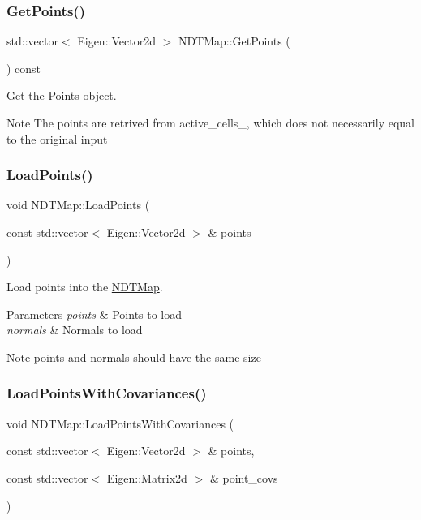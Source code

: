 \subsubsection{\texorpdfstring{Get\+Points()}{GetPoints()}}
{\footnotesize\ttfamily std\+::vector$<$ Eigen\+::\+Vector2d $>$ N\+D\+T\+Map\+::\+Get\+Points (\begin{DoxyParamCaption}{ }\end{DoxyParamCaption}) const}



Get the Points object. 

\begin{DoxyNote}{Note}
The points are retrived from active\+\_\+cells\+\_\+, which does not necessarily equal to the original input 
\end{DoxyNote}
\mbox{\label{classNDTMap_ab22791d0b328ae9639799bc5d31d8b49}} 
\subsubsection{\texorpdfstring{Load\+Points()}{LoadPoints()}}
{\footnotesize\ttfamily void N\+D\+T\+Map\+::\+Load\+Points (\begin{DoxyParamCaption}\item[{const std\+::vector$<$ Eigen\+::\+Vector2d $>$ \&}]{points }\end{DoxyParamCaption})}



Load points into the \hyperlink{classNDTMap}{N\+D\+T\+Map}. 


\begin{DoxyParams}{Parameters}
{\em points} & Points to load \\
\hline
{\em normals} & Normals to load \\
\hline
\end{DoxyParams}
\begin{DoxyNote}{Note}
{\ttfamily points} and {\ttfamily normals} should have the same size 
\end{DoxyNote}
\mbox{\label{classNDTMap_a00f9fe19e50c264cb4cf1de68f0c05e3}} 
\subsubsection{\texorpdfstring{Load\+Points\+With\+Covariances()}{LoadPointsWithCovariances()}}
{\footnotesize\ttfamily void N\+D\+T\+Map\+::\+Load\+Points\+With\+Covariances (\begin{DoxyParamCaption}\item[{const std\+::vector$<$ Eigen\+::\+Vector2d $>$ \&}]{points,  }\item[{const std\+::vector$<$ Eigen\+::\+Matrix2d $>$ \&}]{point\+\_\+covs }\end{DoxyParamCaption})}



